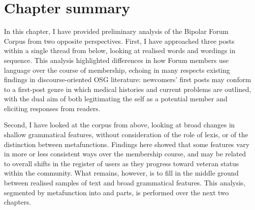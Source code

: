 \section{Chapter summary}

In this chapter, I have provided preliminary analysis of the Bipolar Forum Corpus from two opposite perspectives. First, I have approached three \glspl{post} within a single \gls{thread} from below, looking at realised words and wordings in sequence. This analysis highlighted differences in how Forum members use language over the course of membership, echoing in many respects existing findings in discourse-oriented \gls{OSG} literature: newcomers' first \glspl{post} may conform to a first\hyp{}\gls{post} genre in which medical histories and current problems are outlined, with the dual aim of both legitimating the self as a potential member and eliciting responses from readers.

Second, I have looked at the corpus from above, looking at broad changes in shallow grammatical features, without consideration of the role of lexis, or of the distinction between metafunctions. Findings here showed that some features vary in more or less consistent ways over the membership course, and may be related to overall shifts in the register of users as they progress toward veteran status within the community. What remains, however, is to fill in the middle ground between realised samples of text and broad grammatical features. This analysis, segmented by metafunction into  and  parts, is performed over the next two chapters.
